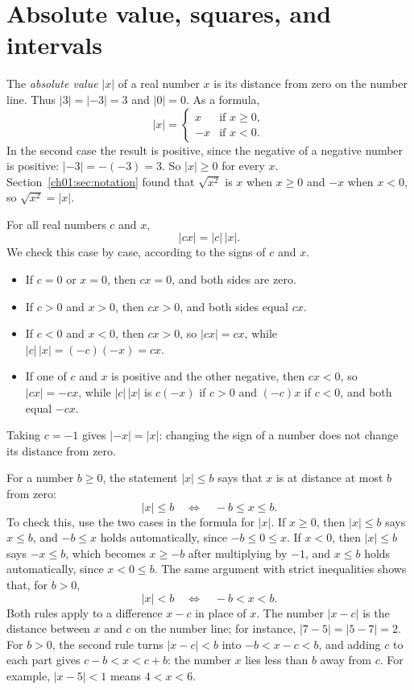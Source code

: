 \section{Absolute value, squares, and intervals}\label{sec:magnitude}
The \emph{absolute value} $|x|$ of a real number $x$ is its distance from zero on the number line. Thus $|3|=|-3|=3$ and $|0|=0$. As a formula,
\[
|x|=\begin{cases}x&\text{if }x\ge0,\\-x&\text{if }x<0.\end{cases}
\]
In the second case the result is positive, since the negative of a negative number is positive: $|-3|=-(-3)=3$. So $|x|\ge0$ for every $x$. Section~\ref{ch01:sec:notation} found that $\sqrt{x^2}$ is $x$ when $x\ge0$ and $-x$ when $x<0$, so $\sqrt{x^2}=|x|$.

For all real numbers $c$ and $x$,
\[
|cx|=|c|\,|x|.
\]
We check this case by case, according to the signs of $c$ and $x$.
\begin{itemize}
\item If $c=0$ or $x=0$, then $cx=0$, and both sides are zero.
\item If $c>0$ and $x>0$, then $cx>0$, and both sides equal $cx$.
\item If $c<0$ and $x<0$, then $cx>0$, so $|cx|=cx$, while $|c|\,|x|=(-c)(-x)=cx$.
\item If one of $c$ and $x$ is positive and the other negative, then $cx<0$, so $|cx|=-cx$, while $|c|\,|x|$ is $c(-x)$ if $c>0$ and $(-c)x$ if $c<0$, and both equal $-cx$.
\end{itemize}
Taking $c=-1$ gives $|-x|=|x|$: changing the sign of a number does not change its distance from zero.

For a number $b\ge0$, the statement $|x|\le b$ says that $x$ is at distance at most $b$ from zero:
\[
|x|\le b\quad\Longleftrightarrow\quad -b\le x\le b.
\]
To check this, use the two cases in the formula for $|x|$. If $x\ge0$, then $|x|\le b$ says $x\le b$, and $-b\le x$ holds automatically, since $-b\le0\le x$. If $x<0$, then $|x|\le b$ says $-x\le b$, which becomes $x\ge-b$ after multiplying by $-1$, and $x\le b$ holds automatically, since $x<0\le b$. The same argument with strict inequalities shows that, for $b>0$,
\[
|x|<b\quad\Longleftrightarrow\quad -b<x<b.
\]
Both rules apply to a difference $x-c$ in place of $x$. The number $|x-c|$ is the distance between $x$ and $c$ on the number line; for instance, $|7-5|=|5-7|=2$. For $b>0$, the second rule turns $|x-c|<b$ into $-b<x-c<b$, and adding $c$ to each part gives $c-b<x<c+b$: the number $x$ lies less than $b$ away from $c$. For example, $|x-5|<1$ means $4<x<6$.

